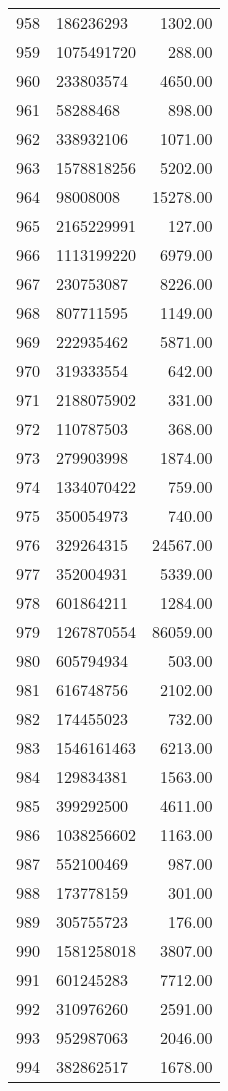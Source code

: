 \begin{table}[ht]
\begin{tabular}{rlr}
  958 & 186236293 & 1302.00 \\ 
  959 & 1075491720 & 288.00 \\ 
  960 & 233803574 & 4650.00 \\ 
  961 & 58288468 & 898.00 \\ 
  962 & 338932106 & 1071.00 \\ 
  963 & 1578818256 & 5202.00 \\ 
  964 & 98008008 & 15278.00 \\ 
  965 & 2165229991 & 127.00 \\ 
  966 & 1113199220 & 6979.00 \\ 
  967 & 230753087 & 8226.00 \\ 
  968 & 807711595 & 1149.00 \\ 
  969 & 222935462 & 5871.00 \\ 
  970 & 319333554 & 642.00 \\ 
  971 & 2188075902 & 331.00 \\ 
  972 & 110787503 & 368.00 \\ 
  973 & 279903998 & 1874.00 \\ 
  974 & 1334070422 & 759.00 \\ 
  975 & 350054973 & 740.00 \\ 
  976 & 329264315 & 24567.00 \\ 
  977 & 352004931 & 5339.00 \\ 
  978 & 601864211 & 1284.00 \\ 
  979 & 1267870554 & 86059.00 \\ 
  980 & 605794934 & 503.00 \\ 
  981 & 616748756 & 2102.00 \\ 
  982 & 174455023 & 732.00 \\ 
  983 & 1546161463 & 6213.00 \\ 
  984 & 129834381 & 1563.00 \\ 
  985 & 399292500 & 4611.00 \\ 
  986 & 1038256602 & 1163.00 \\ 
  987 & 552100469 & 987.00 \\ 
  988 & 173778159 & 301.00 \\ 
  989 & 305755723 & 176.00 \\ 
  990 & 1581258018 & 3807.00 \\ 
  991 & 601245283 & 7712.00 \\ 
  992 & 310976260 & 2591.00 \\ 
  993 & 952987063 & 2046.00 \\ 
  994 & 382862517 & 1678.00 \\ 

\end{tabular}
\end{table}
